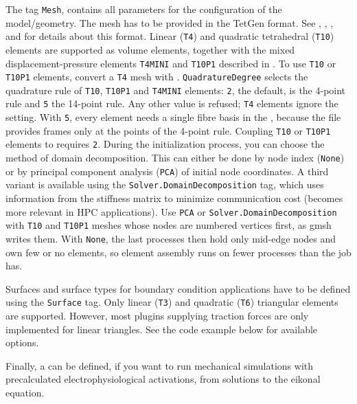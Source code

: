 The tag \verb+Mesh+, contains all parameters for the configuration of the model/geometry.
The mesh has to be provided in the TetGen format.
See , , , and  for details about this format.
Linear (\verb+T4+) and quadratic tetrahedral (\verb+T10+) elements are supported as volume elements, together with the mixed displacement-pressure elements \verb+T4MINI+ and \verb+T10P1+ described in .
To use \verb+T10+ or \verb+T10P1+ elements, convert a \verb+T4+ mesh with .
\verb|QuadratureDegree| selects the quadrature rule of \verb+T10+, \verb+T10P1+ and \verb+T4MINI+ elements: \verb|2|, the default, is the 4-point rule and \verb|5| the 14-point rule.
Any other value is refused; \verb+T4+ elements ignore the setting.
With \verb|5|, every element needs a single fibre basis in the , because the file provides frames only at the points of the 4-point rule.
Coupling \verb+T10+ or \verb+T10P1+ elements to  requires \verb|2|.
During the initialization process, you can choose the method of domain decomposition.
This can either be done by node index (\verb+None+) or by principal component analysis (\verb+PCA+) of initial node coordinates.
A third variant is available using the \verb|Solver.DomainDecomposition| tag, which uses information from the stiffness matrix to minimize communication cost (becomes more relevant in HPC applications).
Use \verb+PCA+ or \verb|Solver.DomainDecomposition| with \verb+T10+ and \verb+T10P1+ meshes whose nodes are numbered vertices first, as gmsh writes them.
With \verb+None+, the last processes then hold only mid-edge nodes and own few or no elements, so element assembly runs on fewer processes than the job has.

Surfaces and surface types for boundary condition applications have to be defined using the \verb|Surface| tag.
Only linear (\verb|T3|) and quadratic (\verb|T6|) triangular elements are supported.
However, most plugins supplying traction forces are only implemented for linear triangles.
See the code example below for available options.

Finally, a  can be defined, if you want to run mechanical simulations with precalculated electrophysiological activations, \eg from solutions to the eikonal equation.

